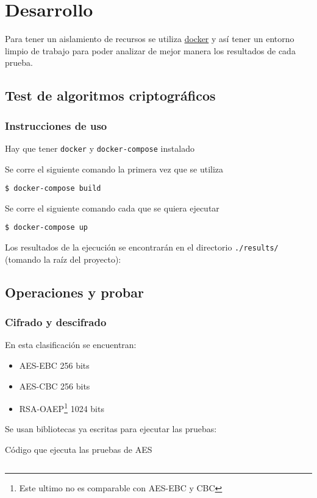\documentclass[../main.tex]{subfiles}
\begin{document}
\section{Desarrollo}\label{sec:desarrollo}

Para tener un aislamiento de recursos se utiliza \href{https://www.docker.com/}{docker} y así tener un entorno limpio
de trabajo para poder analizar de mejor manera los resultados de cada prueba.

\subsection{Test de algoritmos criptográficos}\label{test-de-algoritmos-criptograficos}

\subsubsection{Instrucciones de uso}\label{instrucciones-de-uso}

Hay que tener \texttt{docker} y \texttt{docker-compose} instalado

Se corre el siguiente comando la primera vez que se utiliza

\begin{code}
\begin{verbatim}
$ docker-compose build
\end{verbatim}
\end{code}
Se corre el siguiente comando cada que se quiera ejecutar
\begin{code}
\begin{verbatim}
$ docker-compose up
\end{verbatim}
\end{code}
Los resultados de la ejecución se encontrarán en el directorio \texttt{./results/}
(tomando la raíz del proyecto):

\subsection{Operaciones y probar}\label{clasificaciuxf2n-de-operaciones}
\subsubsection{Cifrado y descifrado}\label{sec:cifrado-y-descifrado}
En esta clasificación se encuentran:
\begin{itemize}
  \item AES-EBC 256 bits
  \item AES-CBC 256 bits
  \item RSA-OAEP\footnote{Este ultimo no es comparable con AES-EBC y CBC} 1024 bits
\end{itemize}
Se usan bibliotecas ya escritas para ejecutar las pruebas:
\begin{code}
  \caption{Código que ejecuta las pruebas de AES}\label{sec:cifrado-y-descifrado-1}
  \inputminted[lastline=81]{python}{../src/test_algoritmos_crypto/AESTests.py}
\end{code}
\end{document}
